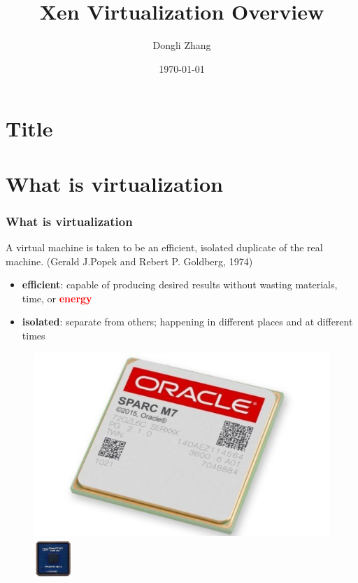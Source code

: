 \documentclass[aspectratio=169]{beamer}
\title[Xen Overview]{Xen Virtualization Overview} %
\author{Dongli Zhang} %
\institute[Oracle] %
{
Oracle Asia Research and Development Centers (Beijing) \\ %
\medskip
\textit{dongli.zhang@oracle.com} %
}
\date{\today} %
\begin{document}

\section{Title}
\begin{frame}
\titlepage %
\end{frame}


\section{What is virtualization}
\begin{frame}
\frametitle{What is virtualization}
A virtual machine is taken to be an efficient, isolated duplicate of the real machine. (Gerald J.Popek and Rebert P. Goldberg, 1974) \pause
\begin{itemize}
\item \textbf{efficient}: capable of producing desired results without wasting materials, time, or \textbf<3->{\textcolor<3->{red}{energy}}\pause \pause
\item \textbf{isolated}: separate from others; happening in different places and at different times \pause
\end{itemize}
\begin{center}
\begin{figure}
\includegraphics[width=0.3\linewidth]{figures/sparc.pdf}
\includegraphics[width=0.2\linewidth]{figures/power.pdf}
\end{figure}
\end{center}
\end{frame}

\end{document}
